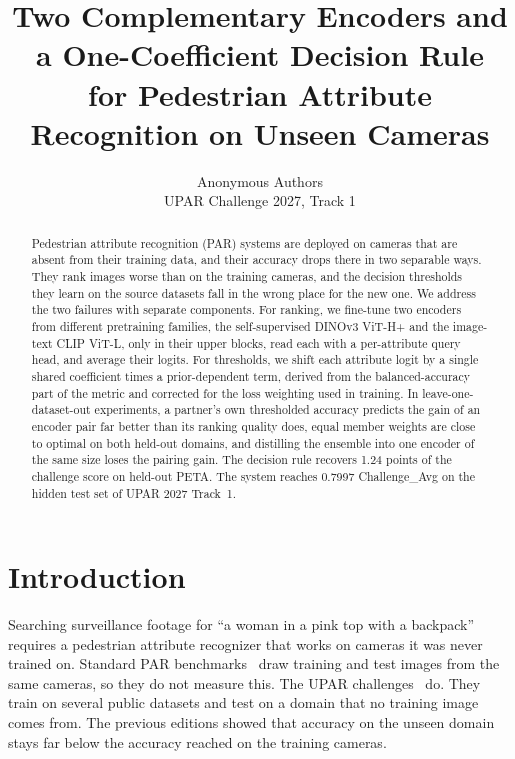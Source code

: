 \documentclass[10pt,twocolumn,letterpaper]{article}
\title{Two Complementary Encoders and a One-Coefficient Decision Rule\\for Pedestrian Attribute Recognition on Unseen Cameras}
\author{Anonymous Authors\\
UPAR Challenge 2027, Track 1}
\begin{document}
\maketitle

\begin{abstract}
Pedestrian attribute recognition (PAR) systems are deployed on cameras that are absent from their training data, and their accuracy drops there in two separable ways. They rank images worse than on the training cameras, and the decision thresholds they learn on the source datasets fall in the wrong place for the new one. We address the two failures with separate components. For ranking, we fine-tune two encoders from different pretraining families, the self-supervised DINOv3 ViT-H+ and the image-text CLIP ViT-L, only in their upper blocks, read each with a per-attribute query head, and average their logits. For thresholds, we shift each attribute logit by a single shared coefficient times a prior-dependent term, derived from the balanced-accuracy part of the metric and corrected for the loss weighting used in training. In leave-one-dataset-out experiments, a partner's own thresholded accuracy predicts the gain of an encoder pair far better than its ranking quality does, equal member weights are close to optimal on both held-out domains, and distilling the ensemble into one encoder of the same size loses the pairing gain. The decision rule recovers 1.24 points of the challenge score on held-out PETA. The system reaches 0.7997 Challenge\_Avg on the hidden test set of UPAR 2027 Track~1.
\end{abstract}

\section{Introduction}
\label{sec:intro}

Searching surveillance footage for ``a woman in a pink top with a backpack'' requires a pedestrian attribute recognizer that works on cameras it was never trained on. Standard PAR benchmarks~\cite{peta,pa100k,market} draw training and test images from the same cameras, so they do not measure this. The UPAR challenges~\cite{upar,upar23,upar24} do. They train on several public datasets and test on a domain that no training image comes from. The previous editions showed that accuracy on the unseen domain stays far below the accuracy reached on the training cameras.
\end{document}
